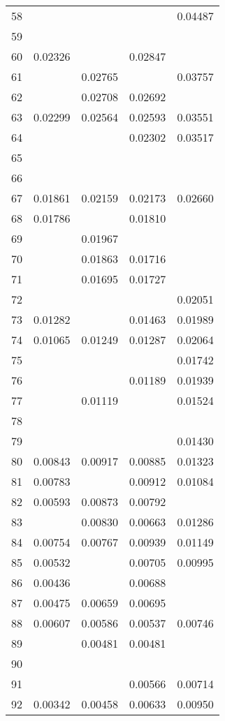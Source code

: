 \documentclass{elsarticle}
\begin{document}
\begin{center}
\begin{longtable}{|c|cccc|}
  58 &  &  &  & 0.04487 \\
  59 &  &  &  &  \\
  60 & 0.02326 &  & 0.02847 &  \\
  61 &  & 0.02765 &  & 0.03757 \\
  62 &  & 0.02708 & 0.02692 &  \\
  63 & 0.02299 & 0.02564 & 0.02593 & 0.03551 \\
  64 &  &  & 0.02302 & 0.03517 \\
  65 &  &  &  &  \\
  66 &  &  &  &  \\
  67 & 0.01861 & 0.02159 & 0.02173 & 0.02660 \\
  68 & 0.01786 &  & 0.01810 &  \\
  69 &  & 0.01967 &  &  \\
  70 &  & 0.01863 & 0.01716 &  \\
  71 &  & 0.01695 & 0.01727 &  \\
  72 &  &  &  & 0.02051 \\
  73 & 0.01282 &  & 0.01463 & 0.01989 \\
  74 & 0.01065 & 0.01249 & 0.01287 & 0.02064 \\
  75 &  &  &  & 0.01742 \\
  76 &  &  & 0.01189 & 0.01939 \\
  77 &  & 0.01119 &  & 0.01524 \\
  78 &  &  &  &  \\
  79 &  &  &  & 0.01430 \\
  80 & 0.00843 & 0.00917 & 0.00885 & 0.01323 \\
  81 & 0.00783 &  & 0.00912 & 0.01084 \\
  82 & 0.00593 & 0.00873 & 0.00792 &  \\
  83 &  & 0.00830 & 0.00663 & 0.01286 \\
  84 & 0.00754 & 0.00767 & 0.00939 & 0.01149 \\
  85 & 0.00532 &  & 0.00705 & 0.00995 \\
  86 & 0.00436 &  & 0.00688 &  \\
  87 & 0.00475 & 0.00659 & 0.00695 &  \\
  88 & 0.00607 & 0.00586 & 0.00537 & 0.00746 \\
  89 &  & 0.00481 & 0.00481 &  \\
  90 &  &  &  &  \\
  91 &  &  & 0.00566 & 0.00714 \\
  92 & 0.00342 & 0.00458 & 0.00633 & 0.00950 \\

\end{longtable}
\end{center}
\end{document}
